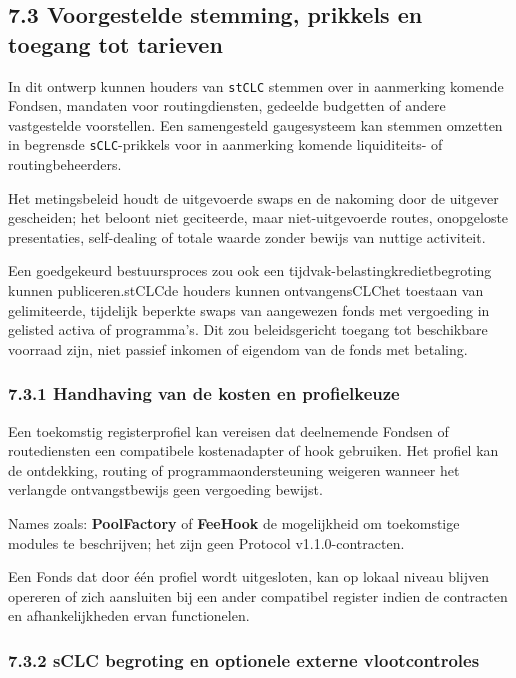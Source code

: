 \documentclass[11pt]{article}
\begin{document}
\subsection*{7.3 Voorgestelde stemming, prikkels en toegang tot tarieven}

In dit ontwerp kunnen houders van \texttt{stCLC} stemmen over in aanmerking komende Fondsen, mandaten voor routingdiensten, gedeelde budgetten of andere vastgestelde voorstellen. Een samengesteld gaugesysteem kan stemmen omzetten in begrensde \texttt{sCLC}-prikkels voor in aanmerking komende liquiditeits- of routingbeheerders.

Het metingsbeleid houdt de uitgevoerde swaps en de nakoming door de uitgever gescheiden; het beloont niet geciteerde, maar niet-uitgevoerde routes, onopgeloste presentaties, self-dealing of totale waarde zonder bewijs van nuttige activiteit.

Een goedgekeurd bestuursproces zou ook een tijdvak-belastingkredietbegroting kunnen publiceren.stCLCde houders kunnen ontvangensCLChet toestaan van gelimiteerde, tijdelijk beperkte swaps van aangewezen fonds met vergoeding in gelisted activa of programma's. Dit zou beleidsgericht toegang tot beschikbare voorraad zijn, niet passief inkomen of eigendom van de fonds met betaling.

\subsubsection*{7.3.1 Handhaving van de kosten en profielkeuze}

Een toekomstig registerprofiel kan vereisen dat deelnemende Fondsen of routediensten een compatibele kostenadapter of hook gebruiken. Het profiel kan de ontdekking, routing of programmaondersteuning weigeren wanneer het verlangde ontvangstbewijs geen vergoeding bewijst.

Names zoals: \textbf{PoolFactory } of \textbf{ FeeHook} de mogelijkheid om toekomstige modules te beschrijven; het zijn geen Protocol v1.1.0-contracten.

Een Fonds dat door één profiel wordt uitgesloten, kan op lokaal niveau blijven opereren of zich aansluiten bij een ander compatibel register indien de contracten en afhankelijkheden ervan functionelen.

\subsubsection*{7.3.2 sCLC begroting en optionele externe vlootcontroles}
\end{document}
